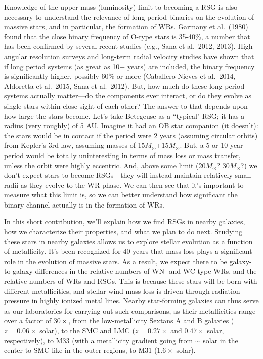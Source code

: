 \documentclass{iau}
\begin{document}
Knowledge of the upper mass (luminosity) limit to becoming a RSG is also necessary to understand the relevance
of long-period binaries on the evolution of massive stars, and in particular, the formation of WRs.  Garmany et al.\ (1980) found that the close
binary frequency of O-type stars is 35-40\%, a number that has been confirmed by several recent studies (e.g., Sana et al.\ 2012, 2013).  High angular resolution surveys and long-term radial velocity studies have shown that if long period systems (as great as 10+ years) are included, the binary frequency is significantly higher, possibly 60\% or more (Caballero-Nieves et al.\ 2014, Aldoretta et al.\ 2015, Sana et al.\ 2012).  But, how much do these long period systems actually matter---do the components ever interact, or do they evolve as single stars within close sight of each other?  The answer to that depends upon how large the stars become.   Let's take Betegeuse as a ``typical" RSG; it has a radius (very roughly) of 5 AU.  Imagine it had an OB star companion (it doesn't): the stars would be in contact if the period were 2 years (assuming circular orbits) from Kepler's 3rd law, assuming masses of 15$M_\odot$+15$M_\odot$.   But, a 5 or 10 year period would be totally uninteresting in terms of mass loss or mass transfer, unless the orbit were highly eccentric.  And, above some limit (20$M_\odot$? 30$M_\odot$?) we don't expect stars to become RSGs---they will instead maintain relatively small radii as they evolve to the WR phase.  We can then see that it's important to measure what this limit is, so we can better understand how significant the binary channel actually is in the formation of WRs.  

In this short contribution, we'll explain how we find RSGs in nearby galaxies, how we characterize their properties, and what we plan to do next. Studying these stars in nearby galaxies allows us to explore stellar evolution as a function of metallicity.  
It's been recognized for 40 years that mass-loss plays a significant role in the evolution of massive stars.  As a result,
we expect there to be galaxy-to-galaxy differences in the relative numbers of WN- and WC-type WRs, and the relative numbers of WRs and RSGs.  This is because these stars will be born with different metallicities, and stellar wind mass-loss is driven through radiation pressure in highly ionized metal lines.  
Nearby star-forming galaxies can thus serve as our laboratories for carrying out such comparisons, as their metallicities range over a factor of $30\times$, from the low-metallicity Sextans A and B galaxies ($z=0.06\times$ solar), 
to the SMC and LMC ($z=0.27\times$ and $0.47 \times$ solar, respectively), to M33 (with a metallicity gradient going from $\sim$ solar in the center to SMC-like in the outer regions, to M31 ($1.6\times$ solar).
\end{document}
